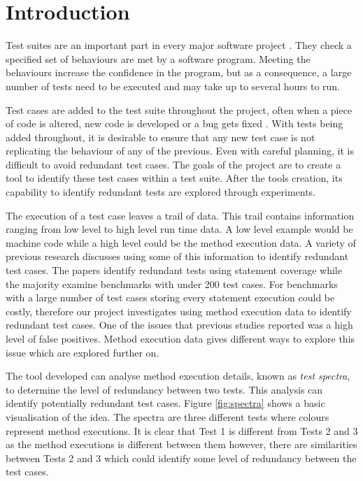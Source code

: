 \chapter{Introduction}\label{C:intro}

Test suites are an important part in every major software project \cite{jeffrey2005test}. They check a specified set of behaviours are met by a software program. Meeting the behaviours increase the confidence in the program, but as a consequence, a large number of tests need to be executed and may take up to several hours to run.

Test cases are added to the test suite throughout the project, often when a piece of code is altered, new code is developed or a bug gets fixed \cite{issuetrack,whentotest}. With tests being added throughout, it is desirable to ensure that any new test case is not replicating the behaviour of any of the previous. Even with careful planning, it is difficult to avoid redundant test cases. The goals of the project are to create a tool to identify these test cases within a test suite. After the tools creation, its capability to identify redundant tests are explored through experiments.


The execution of a test case leaves a trail of data. This trail contains information ranging from low level to high level run time data. A low level example would be machine code while a high level could be the method execution data. A variety of previous research \cite{wong1995effect, wong1999test, rothermel1998empirical, rothermel2002empirical,koochakzadeh2009test,zhang2011empirical,li2008static} discusses using some of this information to identify redundant test cases. The papers identify redundant tests using statement coverage while the majority examine benchmarks with under 200 test cases. For benchmarks with a large number of test cases storing every statement execution could be costly, therefore our project investigates using method execution data to identify redundant test cases. One of the issues that previous studies reported was a high level of false positives. Method execution data gives different ways to explore this issue which are explored further on. 

The tool developed can analyse method execution details, known as \textit{test spectra}, to determine the level of redundancy between two tests. This analysis can identify potentially redundant test cases. Figure \ref{fig:spectra} shows a basic visualisation of the idea. The spectra are three different tests where colours represent method executions. It is clear that Test 1 is different from Tests 2 and 3 as the method executions is different between them however, there are similarities between Tests 2 and 3 which could identify some level of redundancy between the test cases. 


